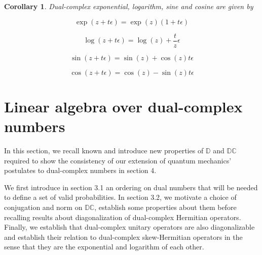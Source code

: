 \documentclass{article}
\newtheorem{corollary}[theorem]{Corollary}
\newcommand{\R}{\mathbb{R}}
\newcommand{\C}{\mathbb{C}}
\newcommand{\D}{\mathbb{D}}
\newcommand{\DC}{\mathbb{DC}}
\newcommand{\Z}{\mathcal{O}_\e}
\newcommand{\e}{\epsilon}
\begin{document}
\begin{corollary} Dual-complex exponential, logarithm, sine and cosine are given by

\begin{multicols}{2}
\noindent \begin{equation}\label{eq:expscalar}
 \exp(z + t\e) = \exp(z)(1 + t\e)
\end{equation}

\noindent \begin{equation}
 \log(z + t\e) = \log(z) + \frac t z \e
\end{equation}

\columnbreak
\noindent \begin{equation}
 \sin(z + t\e) = \sin(z) + \cos(z)t\e
\end{equation}

\noindent \begin{equation}
 \cos(z + t\e) = \cos(z) - \sin(z)t\e
\end{equation}
\end{multicols}
\end{corollary}

\section{Linear algebra over dual-complex numbers}

In this section, we recall known and introduce new properties of $\D$ and $\DC$ required to show the consistency of our extension of quantum mechanics' postulates to dual-complex numbers in section 4.

We first introduce in section 3.1 an ordering on dual numbers that will be needed to define a set of valid probabilities. In section 3.2, we motivate a choice of conjugation and norm on $\DC$, establish some properties about them before recalling results about diagonalization of dual-complex Hermitian operators. Finally, we establish that dual-complex unitary operators are also diagonalizable and establish their relation to dual-complex skew-Hermitian operators in the sense that they are the exponential and logarithm of each other.


%
\end{document}
